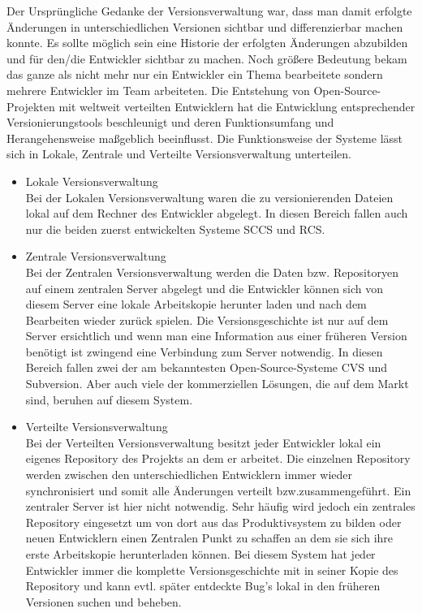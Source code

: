 Der Ursprüngliche Gedanke der Versionsverwaltung war, dass man damit erfolgte Änderungen in unterschiedlichen Versionen sichtbar und differenzierbar machen konnte. Es sollte möglich sein eine Historie der erfolgten Änderungen abzubilden und für den/die Entwickler sichtbar zu machen. Noch größere Bedeutung bekam das ganze als nicht mehr nur ein Entwickler ein Thema bearbeitete sondern mehrere Entwickler im Team arbeiteten. Die Entstehung von Open-Source-Projekten mit weltweit verteilten Entwicklern hat die Entwicklung entsprechender Versionierungstools beschleunigt und deren Funktionsumfang und Herangehensweise maßgeblich beeinflusst.
Die Funktionsweise der Systeme lässt sich in Lokale, Zentrale und Verteilte Versionsverwaltung unterteilen. 
\begin{itemize}
\item{Lokale Versionsverwaltung}\\
Bei der Lokalen Versionsverwaltung waren die zu versionierenden Dateien lokal auf dem Rechner des Entwickler abgelegt. In diesen Bereich fallen auch nur die beiden zuerst entwickelten Systeme SCCS und RCS. 


\item{Zentrale Versionsverwaltung}\\
Bei der Zentralen Versionsverwaltung werden die Daten bzw. Repositoryen auf einem zentralen Server abgelegt und die Entwickler können sich von diesem Server eine lokale Arbeitskopie herunter laden und nach dem Bearbeiten wieder zurück spielen. Die Versionsgeschichte ist nur auf dem Server ersichtlich und wenn man eine Information aus einer früheren Version benötigt ist zwingend eine Verbindung zum Server notwendig. In diesen Bereich fallen zwei der am bekanntesten Open-Source-Systeme CVS und Subversion. Aber auch viele der kommerziellen Lösungen, die auf dem Markt sind, beruhen auf diesem System.



\item{Verteilte Versionsverwaltung}\\
Bei der Verteilten Versionsverwaltung besitzt jeder Entwickler lokal ein eigenes Repository des Projekts an dem er arbeitet. Die einzelnen Repository werden zwischen den unterschiedlichen Entwicklern immer wieder synchronisiert und somit alle Änderungen verteilt bzw.\@	 zusammengeführt. Ein zentraler Server ist hier nicht notwendig. Sehr häufig wird jedoch ein zentrales Repository eingesetzt um von dort aus das Produktivsystem zu bilden oder neuen Entwicklern einen Zentralen Punkt zu schaffen an dem sie sich ihre erste Arbeitskopie herunterladen können. Bei diesem System hat jeder Entwickler immer die komplette Versionsgeschichte mit in seiner Kopie des Repository und kann evtl. später entdeckte Bug's lokal in den früheren Versionen suchen und beheben.
\end{itemize}

